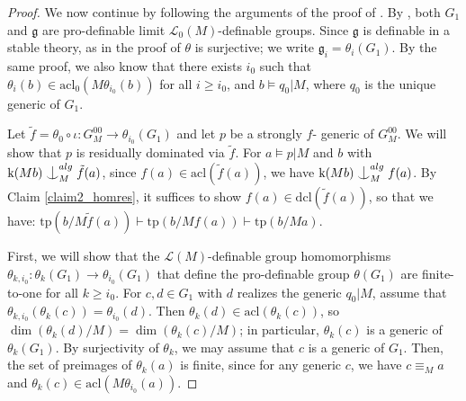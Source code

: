 \documentclass[12pt]{article}
\newcommand{\tpp}{\mathrm{tp}}
\newcommand{\acl}{\mathrm{acl}}
\newcommand{\dcl}{\mathrm{dcl}}
\newcommand{\0}{\emptyset}
\newcommand{\rf}{\mathrm{k}}
\def\forkindep{\mathrel{\raise0.2ex\hbox{\ooalign{\hidewidth$\vert$\hidewidth\cr\raise-0.9ex\hbox{$\smile$}}}}}
\theoremstyle{plain}%
\theoremstyle{definition}
\theoremstyle{remark}
\begin{document}
\begin{proof}



    
We now continue by following the arguments of the proof of \cite[Proposition 4.6]{HR19}. By \cite[Proposition 3.4]{HR19}, both $G_1$ and $\mathfrak{g}$ are pro-definable limit $\mathcal{L}_0(M)$-definable groups. Since $\mathfrak{g}$ is definable in a stable theory, as in the proof of \cite[Proposition 4.6]{HR19} $\theta$ is surjective; we write $\mathfrak{g}_i=\theta_i(G_1)$. By the same proof, we also know that there exists $i_0$ such that $\theta_i (b)\in \acl_0(M\theta_{i_0}(b))$ for all $i\geq i_0$, and $b\models q_0|M$, where $q_0$ is the  unique generic of $G_1$.

 Let $\tilde{f}=\theta_0\circ \iota: G_M^{00}\to \theta_{i_0}(G_1)$ and let $p$ be a strongly $f$- generic of $G_M^{00}$. We will show that $p$ is residually dominated via $\tilde{f}$. For $a\models p|M$ and $b$ with $\rf(Mb)\forkindep_M^{alg}\tilde{f}(a)$, since $f(a)\in \acl(\tilde{f}(a))$, we have $\rf(Mb)\forkindep^{alg}_M f(a)$. By Claim \ref{claim2_homres}, it suffices to show $f(a)\in \dcl(\tilde{f}(a))$, so that we have: $\tpp(b/M\tilde{f}(a))\vdash\tpp(b/Mf(a))\vdash\tpp(b/Ma).$
 
 First, we will show that the $\mathcal{L}(M)$-definable group homomorphisms $\theta_{k,i_0}:\theta_k(G_1)\to \theta_{i_0}(G_1)$ that define the pro-definable group $\theta(G_1)$ are finite-to-one for all $k\geq i_0$. 
 For $c,d \in G_1$ with $d$ realizes the generic $q_0|M$, assume that $\theta_{k,i_0}(\theta_k(c)) = \theta_{i_0}(d)$. 
Then $\theta_k(d) \in \acl(\theta_k(c))$, so $\dim(\theta_k(d)/M) = \dim(\theta_k(c)/M)$; in particular,
$\theta_k(c)$ is a generic of $\theta_k(G_1)$. By surjectivity of $\theta_k$, we may assume that $c$ is a generic of $G_1$. Then, the set of preimages of $\theta_k(a)$ is finite, since for any generic $c$, we have $c\equiv_M a$ and $\theta_{k}(c)\in \acl(M\theta_{i_0}(a))$. 


\end{proof}
\end{document}
